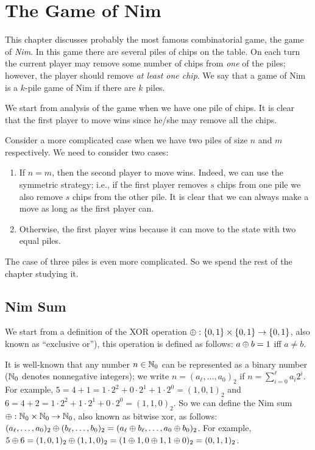 \chapter{The Game of Nim}

This chapter discusses probably the most famous combinatorial game, the game
of \emph{Nim}.
In this game there are several piles of chips on the table. On each turn
the current player may remove some number of chips from \emph{one} of the piles;
however, the player should remove \emph{at least one chip}.
We say that a game of Nim is a $k$-pile game of Nim if there are $k$ piles.

We start from analysis of the game when we have one pile of chips. It is clear
that the first player to move wins since he/she may remove all the chips.

Consider a more complicated case when we have two piles of size $n$ and $m$
respectively. We need to consider two cases:
\begin{enumerate}
  \item If $n = m$, then the second player to move wins. Indeed, we can
    use the symmetric strategy; i.e., if the first player removes $s$
    chips from one pile we also remove $s$ chips from the other pile.
    It is clear that we can always make a move as long as the first player can.
  \item Otherwise, the first player wins because it can move to the state
    with two equal piles.
\end{enumerate}

The case of three piles is even more complicated. So we spend the rest of the
chapter studying it.

\section{Nim Sum}

We start from a definition of the XOR operation
$\lxor : \set{0, 1} \times \set{0, 1} \to \set{0, 1}$,
also known as ``exclusive or''), this operation is defined as follows:
$a \oplus b = 1$ iff $a \neq b$.

It is well-known that any number $n \in {\mathbb{N}}_0$
can be represented as a binary number (${\mathbb{N}}_0$ denotes nonnegative integers);
we write $n = (a_\ell, \dots, a_0)_2$ if $n = \sum_{i = 0}^\ell a_i 2^i$.
For example,
$5 = 4 + 1 = 1 \cdot 2^2 + 0 \cdot 2^1 + 1 \cdot 2^0 = (1, 0, 1)_2$ and
$6 = 4 + 2 = 1 \cdot 2^2 + 1 \cdot 2^1 + 0 \cdot 2^0 = (1, 1, 0)_2$.
So we can define the Nim sum $\oplus : {\mathbb{N}}_0 \times {\mathbb{N}}_0 \to {\mathbb{N}}_0$, also
known as bitwise xor, as follows:
$(a_\ell, \dots, a_0)_2 \oplus (b_\ell, \dots, b_0)_2 =
    (a_\ell \oplus b_\ell, \dots, a_0 \oplus b_0)_2$.
For example, $5 \oplus 6 = (1, 0, 1)_2 \oplus (1, 1, 0)_2 =
(1 \oplus 1, 0 \oplus 1, 1 \oplus 0)_2 = (0, 1, 1)_2$.

